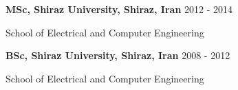 \documentclass[margin, line]{res}
\newenvironment{list1}{
  \begin{list}{\ding{113}}{%
      \setlength{\itemsep}{0in}
      \setlength{\parsep}{0in} \setlength{\parskip}{0in}
      \setlength{\topsep}{0in} \setlength{\partopsep}{0in} 
      \setlength{\leftmargin}{0.17in}}}{\end{list}}
\newenvironment{list2}{
  \begin{list}{$\bullet$}{%
      \setlength{\itemsep}{0in}
      \setlength{\parsep}{0in} \setlength{\parskip}{0in}
      \setlength{\topsep}{0in} \setlength{\partopsep}{0in} 
      \setlength{\leftmargin}{0.2in}}}{\end{list}}
\begin{document}
\begin{resume}
\begin{list1}
\item[] \textbf{MSc, Shiraz University, Shiraz, Iran} \hspace*{\fill} 2012 - 2014
\item[]School of Electrical and Computer Engineering
\item[] \textbf{BSc, Shiraz University, Shiraz, Iran} \hspace*{\fill}2008 - 2012
\item[]School of Electrical and Computer Engineering


\end{list1}
\end{resume}
\end{document}
